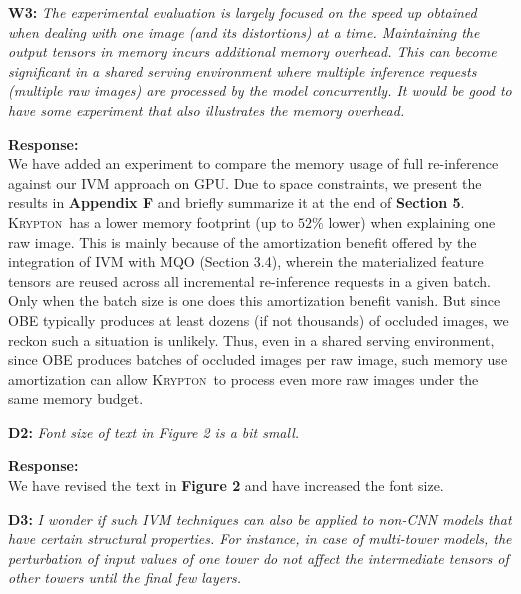 \documentclass[preprint]{vldb}
\newcommand{\system}{\textsc{Krypton}}
\begin{document}
\vspace{2mm}
\noindent \textbf{W3:} \textit{ The experimental evaluation is largely focused on the speed up obtained when dealing with one image (and its distortions) at a time. Maintaining the output tensors in memory incurs additional memory overhead. This can become significant in a shared serving environment where multiple inference requests (multiple raw images) are processed by the model concurrently. It would be good to have some experiment that also illustrates the memory overhead.}

\vspace{2mm}
\noindent \textbf{Response:}\\
We have added an experiment to compare the memory usage of full re-inference against our IVM approach on GPU. Due to space constraints, we present the results in \textbf{Appendix F} and briefly summarize it at the end of \textbf{Section 5}. \system ~has a lower memory footprint (up to $52\%$ lower) when explaining one raw image. This is mainly because of the amortization benefit offered by the integration of IVM with MQO (Section 3.4), wherein the materialized feature tensors are reused across all incremental re-inference requests in a given batch. Only when the batch size is one does this amortization benefit vanish. But since OBE typically produces at least dozens (if not thousands) of occluded images, we reckon such a situation is unlikely. Thus, even in a shared serving environment, since OBE produces batches of occluded images per raw image, such memory use amortization can allow \system ~to process even more raw images under the same memory budget.

\vspace{2mm}
\noindent \textbf{D2:} \textit{ Font size of text in Figure 2 is a bit small.}

\vspace{2mm}
\noindent \textbf{Response:}\\
We have revised the text in \textbf{Figure 2} and have increased the font size.

\vspace{2mm}
\noindent \textbf{D3:} \textit{I wonder if such IVM techniques can also be applied to non-CNN models that have certain structural properties. For instance, in case of multi-tower models, the perturbation of input values of one tower do not affect the intermediate tensors of other towers until the final few layers.}
\end{document}
